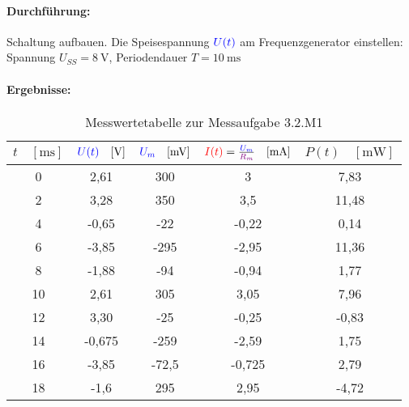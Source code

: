 \documentclass[11pt,a4paper,titlepage]{scrreprt}
\begin{document}
                    \paragraph{Durchführung:} Schaltung aufbauen. Die Speisespannung $\textcolor{blue}{U(t)}$ am Frequenzgenerator einstellen: Spannung $U_{SS} = \SI{8}{\volt}$, Periodendauer  $T = \SI{10}{\milli\second}$ 
                    \paragraph{Ergebnisse:}
                        \begin{center}
                            \begin{table}[!hbtp]
                                \caption{Messwertetabelle zur Messaufgabe 3.2.M1}
                                \label{tbl:messergebnisse3.1}
                                \renewcommand{\arraystretch}{1.3}
                                \begin{center}
                                    \begin{tabular}{c|cccc}
  										 $t \quad [\si{\milli\second}]$ & $\textcolor{blue}{U(t)}\quad  [\si{\volt}]$ & $\textcolor{blue}{U_m} \quad [\si{\milli\volt}]$ & $\textcolor{red}{I(t)} = \frac{\textcolor{blue}{U_m}}{\textcolor{violet}{R_m}}  \quad[\si{\milli\ampere}]$ & $P(t) \quad [\si{\milli\watt}]$\\ \hline
   										0 & 2,61 & 300 & 3  & 7,83\\
   										2 & 3,28 & 350 & 3,5 & 11,48\\
   										4 & -0,65 & -22 & -0,22& 0,14\\
   										6 & -3,85 & -295 & -2,95 & 11,36\\
  										8 & -1,88 & -94 & -0,94 & 1,77\\
   										10 & 2,61 & 305 & 3,05 & 7,96\\
   										12 & 3,30 & -25 & -0,25 & -0,83\\
   										14 & -0,675 & -259 & -2,59 & 1,75\\
   										16 & -3,85 & -72,5 & -0,725 & 2,79\\
   										18 & -1,6 & 295 & 2,95 & -4,72\\
									\end{tabular}
                                \end{center}
                            \end{table}
                        \end{center}
                    
\end{document}
